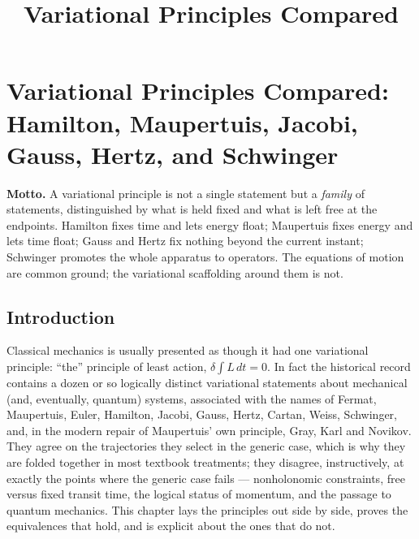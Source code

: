 \documentclass[11pt]{book}
\title{Variational Principles Compared}
\author{}
\date{}
\theoremstyle{definition}
\theoremstyle{plain}
\theoremstyle{remark}
\begin{document}
\pagestyle{plain}

\chapter{Variational Principles Compared: Hamilton, Maupertuis, Jacobi, Gauss, Hertz, and Schwinger}
\label{ch:variational}

\begin{motto}
\textbf{Motto.} A variational principle is not a single statement but a \emph{family} of statements, distinguished by what is held fixed and what is left free at the endpoints. Hamilton fixes time and lets energy float; Maupertuis fixes energy and lets time float; Gauss and Hertz fix nothing beyond the current instant; Schwinger promotes the whole apparatus to operators. The equations of motion are common ground; the variational scaffolding around them is not.
\end{motto}

\section{Introduction}

Classical mechanics is usually presented as though it had one variational principle: ``the'' principle of least action, $\delta\!\int L\,dt = 0$. In fact the historical record contains a dozen or so logically distinct variational statements about mechanical (and, eventually, quantum) systems, associated with the names of Fermat, Maupertuis, Euler, Hamilton, Jacobi, Gauss, Hertz, Cartan, Weiss, Schwinger, and, in the modern repair of Maupertuis' own principle, Gray, Karl and Novikov. They agree on the trajectories they select in the generic case, which is why they are folded together in most textbook treatments; they disagree, instructively, at exactly the points where the generic case fails --- nonholonomic constraints, free versus fixed transit time, the logical status of momentum, and the passage to quantum mechanics. This chapter lays the principles out side by side, proves the equivalences that hold, and is explicit about the ones that do not.
\end{document}
